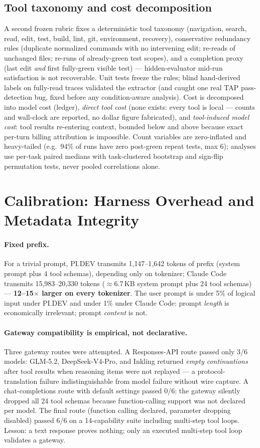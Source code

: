 \documentclass[11pt]{article}
\newcommand{\pidev}{PI.DEV}
\newcommand{\cc}{Claude Code}
\newcommand{\xd}{$\times$}
\begin{document}
\subsection{Tool taxonomy and cost decomposition}
A second frozen rubric fixes a deterministic tool taxonomy (navigation,
search, read, edit, test, build, lint, git, environment, recovery),
conservative redundancy rules (duplicate normalized commands with no
intervening edit; re-reads of unchanged files; re-runs of already-green
test scopes), and a completion proxy (last edit \emph{and} first
fully-green visible test) --- hidden-evaluator mid-run satisfaction is not
recoverable. Unit tests freeze the rules; blind hand-derived labels on
fully-read traces validated the extractor (and caught one real TAP
pass-detection bug, fixed before any condition-aware analysis). Cost is
decomposed into model cost (ledger), \emph{direct tool cost} (none exists:
every tool is local --- counts and wall-clock are reported, no dollar
figure fabricated), and \emph{tool-induced model cost}: tool results
re-entering context, bounded below and above because exact per-turn
billing attribution is impossible. Count variables are zero-inflated and
heavy-tailed (e.g.\ 94\% of runs have zero post-green repeat tests, max
6); analyses use per-task paired medians with task-clustered bootstrap and
sign-flip permutation tests, never pooled correlations alone.

\section{Calibration: Harness Overhead and Metadata Integrity}

\paragraph{Fixed prefix.}
For a trivial prompt, \pidev{} transmits 1{,}147--1{,}642 tokens of prefix
(system prompt plus 4 tool schemas), depending only on tokenizer; \cc{}
transmits 15{,}983--20{,}330 tokens ($\approx$6.7\,KB system prompt plus
24 tool schemas) --- \textbf{12--15\xd{} larger on every tokenizer}. The
user prompt is under 5\% of logical input under \pidev{} and under 1\%
under \cc{}: prompt \emph{length} is economically irrelevant; prompt
\emph{content} is not.

\paragraph{Gateway compatibility is empirical, not declarative.}
Three gateway routes were attempted. A Responses-API route passed only
3/6 models: GLM-5.2, DeepSeek-V4-Pro, and Inkling returned \emph{empty
continuations} after tool results when reasoning items were not replayed
--- a protocol-translation failure indistinguishable from model failure
without wire capture. A chat-completions route with default settings
passed 0/6: the gateway silently dropped all 24 tool schemas because
function-calling support was not declared per model. The final route
(function calling declared, parameter dropping disabled) passed 6/6 on a
14-capability suite including multi-step tool loops. Lesson: a text
response proves nothing; only an executed multi-step tool loop validates a
gateway.
\end{document}
